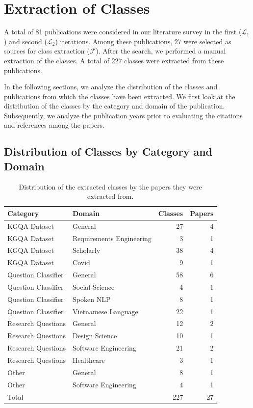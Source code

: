 
\section{Extraction of Classes}
\label{sec:kgqa_extraction_of_classes}

A total of 81 publications were considered in our literature survey in the first ($\mathcal{L}_1$) and second ($\mathcal{L}_2$) iterations. Among these publications, 27 were selected as sources for class extraction ($\mathcal{F}$). After the search, we performed a manual extraction of the classes. A total of 227 classes were extracted from these publications. 

In the following sections, we analyze the distribution of the classes and publications from which the classes have been extracted. We first look at the distribution of the classes by the category and domain of the publication. Subsequently, we analyze the publication years prior to evaluating the citations and references among the papers.

\subsection{Distribution of Classes by Category and Domain}

\begin{table}[t]
    \centering
    \begin{tabular}{l l r r}
        \toprule
        \textbf{Category} & \textbf{Domain} & \textbf{Classes} & \textbf{Papers} \\
        \midrule
        KGQA Dataset & General & 27 & 4 \\
        KGQA Dataset & Requirements Engineering & 3 & 1 \\
        KGQA Dataset & Scholarly & 38 & 4 \\
        KGQA Dataset & Covid & 9 & 1 \\
        Question Classifier & General & 58 & 6 \\
        Question Classifier & Social Science & 4 & 1 \\
        Question Classifier & Spoken NLP & 8 & 1 \\
        Question Classifier & Vietnamese Language & 22 & 1 \\
        Research Questions & General & 12 & 2 \\
        Research Questions & Design Science & 10 & 1 \\
        Research Questions & Software Engineering & 21 & 2 \\
        Research Questions & Healthcare & 3 & 1 \\
        Other & General & 8 & 1 \\
        Other & Software Engineering & 4 & 1 \\
        Total & & 227 & 27 \\
        \bottomrule
    \end{tabular}
    \caption[Distribution of Classes by Paper Category and Domain]{Distribution of the extracted classes by the papers they were extracted from.}
    \label{table:question_type_distribution}
\end{table}


